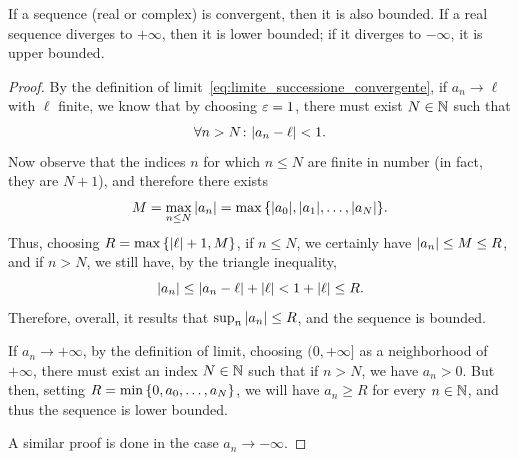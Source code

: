 \begin{theorem}
  \label{th:limitatezza_successione_convergente}%
\mymark{**}%
If a sequence (real or complex) is convergent, then it is also bounded.
If a real sequence diverges to $+\infty$, then it is lower bounded; if it
diverges to $-\infty$, it is upper bounded.
\end{theorem}
%
\begin{proof}
  By the definition of limit~\eqref{eq:limite_successione_convergente}, 
  if $a_n\to \ell$ with $\ell$ finite, we know 
  that by choosing $\varepsilon=1$, there must exist $N\in {\mathbb N}$ such that 
  \[
      \forall n>N\colon {\left|a_n - \ell\right|} < 1.
  \]
  Now observe that the indices $n$ for which $n\le N$ are finite in number 
  (in fact, they are $N+1$), and therefore there exists
  \[
   M = \max_{n\le N} {\left|a_n\right|} 
   = \max {\left\{ {\left|a_0\right|}, {\left|a_1\right|}, \dots , {\left|a_N\right|} \right\}}.  
  \]
  Thus, choosing $R=\max{\left\{ {\left|\ell\right|}+1,M \right\}}$, 
  if $n\le N$, we certainly have ${\left|a_n\right|}\le M \le R$,
  and if $n>N$, we still have, by the triangle inequality,
  \[
  {\left|a_n\right|} \le {\left|a_n-\ell\right|} + {\left|\ell\right|} < 1+ {\left|\ell\right|} \le R.  
  \]
  Therefore, overall, it results that $\sup_n {\left|a_n\right|}\le R$, and the sequence 
  is bounded.

  If $a_n\to +\infty$, by the definition of limit, 
  choosing $(0,+\infty]$ as a neighborhood of $+\infty$, 
  there must exist an index $N\in {\mathbb N}$ such that if $n>N$, we have $a_n>0$. 
  But then, setting $R=\min{\left\{ 0, a_0,\dots,a_N \right\}}$,
  we will have $a_n\ge R$ for every $n\in {\mathbb N}$, and thus the sequence 
  is lower bounded.

  A similar proof is done in the case $a_n\to -\infty$.
\end{proof}


%

